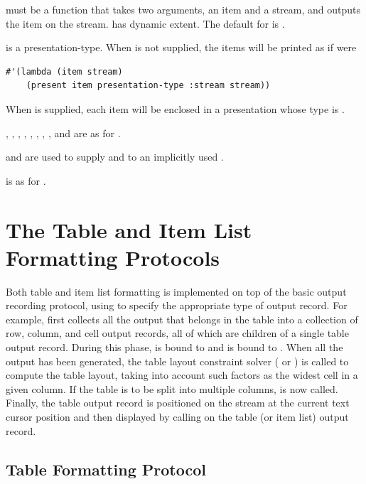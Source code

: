  must be a function that takes two arguments, an item and a stream,
and outputs the item on the stream.   has dynamic extent.  The
default for  is .

 is a presentation-type.  When  is not
supplied, the items will be printed as if  were
\begin{verbatim}
#'(lambda (item stream)
    (present item presentation-type :stream stream))
\end{verbatim}
When  is supplied, each item will be enclosed in a presentation
whose type is .

, , , ,
, , , , and
 are as for .

 and  are used to supply  and
 to an implicitly used .

 is as for .


\section {The Table and Item List Formatting Protocols}

Both table and item list formatting is implemented on top of the basic output
recording protocol, using  to specify the appropriate
type of output record.  For example,  first collects all
the output that belongs in the table into a collection of row, column, and cell
output records, all of which are children of a single table output record.
During this phase,  is bound to  and
 is bound to .  When all the output has been
generated, the table layout constraint solver ( or
) is called to compute the table layout, taking into
account such factors as the widest cell in a given column.  If the table is to
be split into multiple columns,  is now called.
Finally, the table output record is positioned on the stream at the current text
cursor position and then displayed by calling  on the table (or item
list) output record.


\subsection {Table Formatting Protocol}

